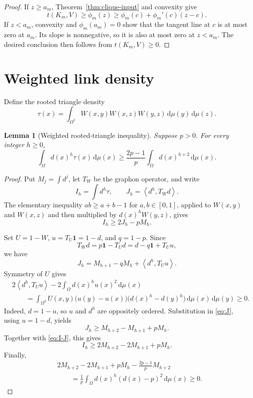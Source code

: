 \documentclass[11pt]{article}
\newtheorem{lemma}[theorem]{Lemma}
\newcommand{\dd}{\,\mathrm{d}}
\newcommand{\one}{\mathbf{1}}
\newcommand{\ip}[2]{\left\langle #1,#2\right\rangle}
\begin{document}
\begin{proof}
If $z\geq a_m$, Theorem~\ref{thm:clique-input} and convexity give
\[
t(K_m,V)\geq\phi_m(z)
\geq\phi_m(c)+\phi_m'(c)(z-c).
\]
If $z<a_m$, convexity and $\phi_m(a_m)=0$ show that the tangent line
at $c$ is at most zero at $a_m$.  Its slope is nonnegative, so it is
also at most zero at $z<a_m$.  The desired conclusion then follows
from $t(K_m,V)\geq0$.
\end{proof}


\section{Weighted link density}

Define the rooted triangle density
\[
\tau(x)=
\int_{\Omega^2}
W(x,y)W(x,z)W(y,z)
\dd\mu(y)\dd\mu(z).
\]

\begin{lemma}[Weighted rooted-triangle inequality]
\label{lem:weighted-triangle}
Suppose $p>0$.  For every integer $h\geq0$,
\[
\int_\Omega d(x)^h\tau(x)\dd\mu(x)
\geq
\frac{2p-1}{p}
\int_\Omega d(x)^{h+2}\dd\mu(x).
\]
\end{lemma}

\begin{proof}
Put $M_j=\int d^j$, let $T_W$ be the graphon operator, and write
\[
I_h=\int d^h\tau,
\qquad
J_h=\ip{d^h}{T_Wd}.
\]
The elementary inequality $ab\geq a+b-1$ for $a,b\in[0,1]$, applied
to $W(x,y)$ and $W(x,z)$ and then multiplied by
$d(x)^hW(y,z)$, gives
\begin{equation}
I_h\geq2J_h-pM_h.
\label{eq:I-J}
\end{equation}

Set $U=1-W$, $u=T_U\one=1-d$, and $q=1-p$.  Since
\[
T_Wd=p\one-T_Ud=d-q\one+T_Uu,
\]
we have
\begin{equation}
J_h=M_{h+1}-qM_h+\ip{d^h}{T_Uu}.
\label{eq:J}
\end{equation}
Symmetry of $U$ gives
\begin{align*}
&2\ip{d^h}{T_Uu}
-2\int_\Omega d(x)^hu(x)^2\dd\mu(x)
\\
&\qquad=
\int_{\Omega^2}U(x,y)
\bigl(u(y)-u(x)\bigr)
\bigl(d(x)^h-d(y)^h\bigr)
\dd\mu(x)\dd\mu(y)
\geq0.
\end{align*}
Indeed, $d=1-u$, so $u$ and $d^h$ are oppositely ordered.  Substitution
in \eqref{eq:J}, using $u=1-d$, yields
\[
J_h\geq M_{h+2}-M_{h+1}+pM_h.
\]
Together with \eqref{eq:I-J}, this gives
\[
I_h\geq2M_{h+2}-2M_{h+1}+pM_h.
\]
Finally,
\begin{align*}
&2M_{h+2}-2M_{h+1}+pM_h
-\frac{2p-1}{p}M_{h+2}
\\
&\qquad=
\frac1p\int_\Omega d(x)^h(d(x)-p)^2\dd\mu(x)
\geq0.
\end{align*}
\end{proof}
\end{document}
